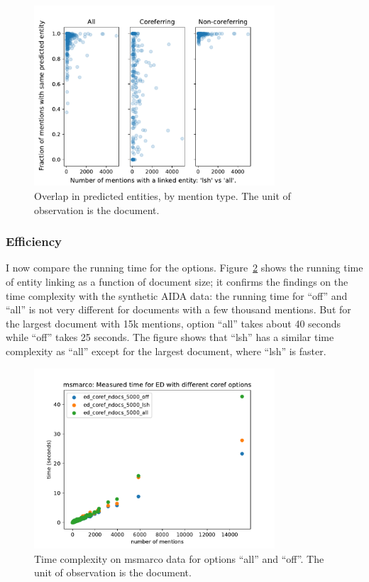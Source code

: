 \documentclass[a4paper,11pt]{article}
\numberwithin{equation}{section} %
\begin{document}
\begin{figure}[H]
  \centering
  \includegraphics[width = 0.8\textwidth]{../figs/msmarco_overlap_lsh.pdf}
  \caption{Overlap in predicted entities, by mention type. The unit of observation is the document.}
  \label{fig:msmarco_overlap_lsh}
\end{figure}


\subsubsection{Efficiency}

I now compare the running time for the options. Figure~\ref{fig:timing_msmarco} shows the running time of entity linking as a function of document size; it confirms the findings on the time complexity with the synthetic AIDA data:  the running time for ``off'' and ``all'' is not very different for documents with a few thousand mentions. But for the largest document with 15k mentions, option ``all'' takes about 40 seconds while ``off'' takes 25 seconds.
The figure shows that ``lsh'' has a similar time complexity as ``all'' except for the largest document, where ``lsh'' is faster. 

\begin{figure}[H]
  \centering
  \includegraphics[width = 0.8\textwidth]{../figs/timing_msmarco.pdf}
  \caption{Time complexity on msmarco data for options ``all'' and ``off''. The unit of observation is the document.}
  \label{fig:timing_msmarco}
\end{figure}
\end{document}
